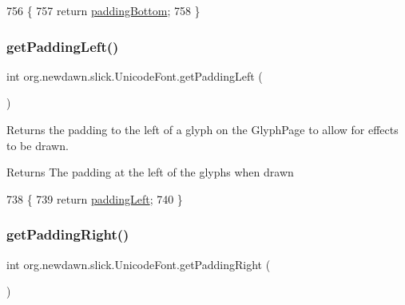 \begin{DoxyCode}
756                                   \{
757         \textcolor{keywordflow}{return} \mbox{\hyperlink{classorg_1_1newdawn_1_1slick_1_1_unicode_font_a101f8814305c63cba7b7bbb7d1bf87ae}{paddingBottom}};
758     \}
\end{DoxyCode}
\mbox{\label{classorg_1_1newdawn_1_1slick_1_1_unicode_font_ae7524dd1bc030351f6a739206e97413a}} 
\subsubsection{\texorpdfstring{get\+Padding\+Left()}{getPaddingLeft()}}
{\footnotesize\ttfamily int org.\+newdawn.\+slick.\+Unicode\+Font.\+get\+Padding\+Left (\begin{DoxyParamCaption}{ }\end{DoxyParamCaption})\hspace{0.3cm}{\ttfamily [inline]}}

Returns the padding to the left of a glyph on the Glyph\+Page to allow for effects to be drawn.

\begin{DoxyReturn}{Returns}
The padding at the left of the glyphs when drawn 
\end{DoxyReturn}

\begin{DoxyCode}
738                                 \{
739         \textcolor{keywordflow}{return} \mbox{\hyperlink{classorg_1_1newdawn_1_1slick_1_1_unicode_font_a2c0919e4c3c800093767e29827064b0e}{paddingLeft}};
740     \}
\end{DoxyCode}
\mbox{\label{classorg_1_1newdawn_1_1slick_1_1_unicode_font_abacb07d8c4dd9a0c977ea5cbc34de6a7}} 
\subsubsection{\texorpdfstring{get\+Padding\+Right()}{getPaddingRight()}}
{\footnotesize\ttfamily int org.\+newdawn.\+slick.\+Unicode\+Font.\+get\+Padding\+Right (\begin{DoxyParamCaption}{ }\end{DoxyParamCaption})\hspace{0.3cm}{\ttfamily [inline]}}


